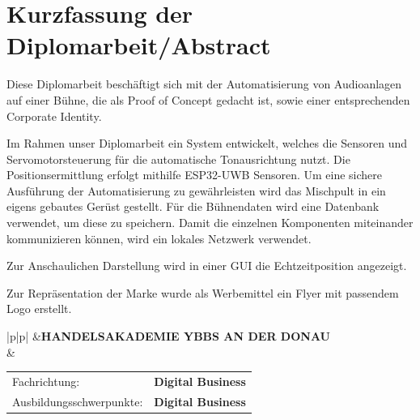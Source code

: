 \chapter*{Kurzfassung der Diplomarbeit/Abstract} 

Diese Diplomarbeit beschäftigt sich mit der Automatisierung von Audioanlagen auf einer Bühne, die als Proof of Concept gedacht ist, sowie einer entsprechenden Corporate Identity.

 Im Rahmen unser Diplomarbeit ein System entwickelt, welches die Sensoren und Servomotorsteuerung für die automatische Tonausrichtung nutzt. Die Positionsermittlung erfolgt mithilfe ESP32-UWB Sensoren. Um eine sichere Ausführung der Automatisierung zu gewährleisten wird das Mischpult in ein eigens gebautes Gerüst gestellt. Für die Bühnendaten wird eine Datenbank verwendet, um diese zu speichern. Damit die einzelnen Komponenten miteinander kommunizieren können, wird ein lokales Netzwerk verwendet.
 
Zur Anschaulichen Darstellung wird in einer GUI die Echtzeitposition angezeigt.

Zur Repräsentation der Marke wurde als Werbemittel ein Flyer mit passendem Logo erstellt. 



\clearpage

\newlength{\haklogobreite}
\newlength{\beschriftungsbreite}
\newlength{\feldA}
\newlength{\feldB}

\begin{tabular}{|p{\haklogobreite}|p{\beschriftungsbreite}|}
\hline
{}&{\vspace{0.05em}\textbf{HANDELSAKADEMIE YBBS AN DER DONAU}}\\[1.05em]
 & { \begin{tabular}{p{\feldA} p{\feldB}}
    Fachrichtung:&\textbf{Digital Business}\\
    Ausbildungsschwerpunkte:&\textbf{Digital Business}\\
   \end{tabular}
   }\\
\hline
\end{tabular}

